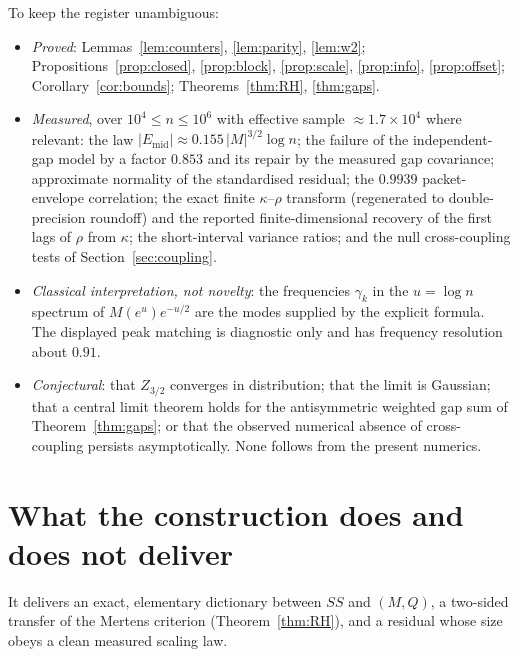 \documentclass[11pt]{amsart}
\numberwithin{equation}{section}
\theoremstyle{plain}
\theoremstyle{definition}
\theoremstyle{remark}
\newcommand{\Mert}{M}
\newcommand{\Sq}{Q}
\begin{document}
To keep the register unambiguous:
\begin{itemize}[leftmargin=1.6em]
\item \emph{Proved}: Lemmas~\ref{lem:counters}, \ref{lem:parity}, \ref{lem:w2};
Propositions~\ref{prop:closed}, \ref{prop:block}, \ref{prop:scale},
\ref{prop:info}, \ref{prop:offset}; Corollary~\ref{cor:bounds};
Theorems~\ref{thm:RH}, \ref{thm:gaps}.
\item \emph{Measured}, over $10^{4}\le n\le10^{6}$ with effective sample
$\approx1.7\times10^{4}$ where relevant: the law
$|E_{\mathrm{mid}}|\approx0.155\,|\Mert|^{3/2}\log n$; the failure of the
independent-gap model by a factor $0.853$ and its repair by the measured gap
covariance; approximate normality of the standardised residual; the
$0.9939$ packet-envelope correlation; the exact finite $\kappa$--$\rho$ transform (regenerated to double-precision
roundoff) and the reported finite-dimensional recovery of the first lags of $\rho$
from $\kappa$; the short-interval variance ratios; and the
null cross-coupling tests of Section~\ref{sec:coupling}.
\item \emph{Classical interpretation, not novelty}: the frequencies $\gamma_k$
in the $u=\log n$ spectrum of $M(e^u)e^{-u/2}$ are the modes supplied by the
explicit formula. The displayed peak matching is diagnostic only and has
frequency resolution about $0.91$.
\item \emph{Conjectural}: that $Z_{3/2}$ converges in distribution; that the
limit is Gaussian; that a central limit theorem holds for the antisymmetric
weighted gap sum of Theorem~\ref{thm:gaps}; or that the observed numerical
absence of cross-coupling persists asymptotically. None follows from the present
numerics.
\end{itemize}

\section{What the construction does and does not deliver}
\label{sec:deliverables}

It delivers an exact, elementary dictionary between $SS$ and $(\Mert,\Sq)$, a
two-sided transfer of the Mertens criterion (Theorem~\ref{thm:RH}), and a
residual whose size obeys a clean measured scaling law.
\end{document}
